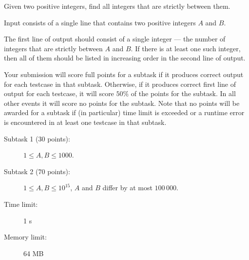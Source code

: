 \documentclass{boi2014}
\newcommand{\includefile}[1]{\vspace{-1.5em}}
\begin{document}
    Given two positive integers, find all integers that are strictly
    between them.

    \Input
    Input consists of a single line that contains two positive
    integers $A$ and $B$.

    \Output
    The first line of output should consist of a single integer ---
    the number of integers that are strictly between $A$ and $B$.
    If there is at least one such integer, then all of them should
    be listed in increasing order in the second line of output.
    
    \Examples

    \simpleexample
    {\includefile{numbers.1-01p.in}}
    {\includefile{numbers.1-01p.sol}}

    \simpleexample
    {\includefile{numbers.1-02p.in}}
    {\includefile{numbers.1-02p.sol}}

    \Scoring

        Your submission will score full points for a subtask if it
        produces correct output for each testcase in 
        that subtask. Otherwise, if it produces correct first
        line of output for each testcase, it will score $50\%$ of the
        points for the subtask. In all other events it will score no
        points for the subtask.
        Note that no points will be awarded for a subtask if
        (in particular) time
        limit is exceeded or a runtime error is encountered in at
        least one testcase in that subtask.

    \begin{description}

        \item[Subtask 1 (30 points):] $1 \le A, B \le 1000$. 
        \item[Subtask 2 (70 points):] $1 \le A, B \le 10^{15}$,
            $A$ and $B$ differ by at most $100\,000$.
    \end{description}

    \Constraints

    \begin{description}
        \item[Time limit:] 1 s
        \item[Memory limit:] 64 MB
    \end{description}
\end{document}
